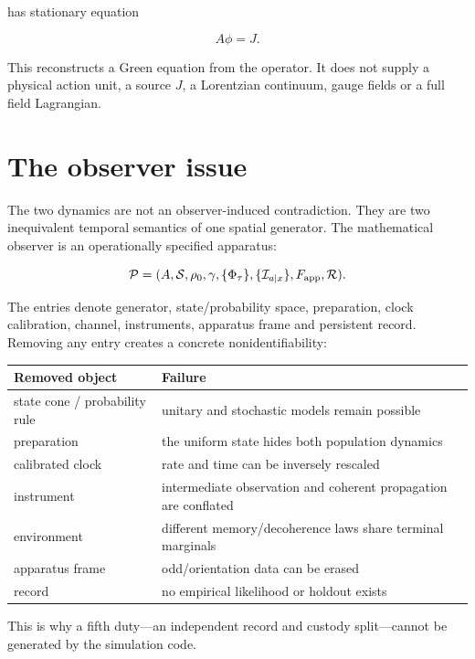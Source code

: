 \documentclass[11pt,a4paper,openany]{report}
\begin{document}
has stationary equation

\[
A\phi=J.
\]

This reconstructs a Green equation from the operator. It does not supply a physical action unit, a source \(J\), a Lorentzian continuum, gauge fields or a full field Lagrangian.

\section{The observer issue}

The two dynamics are not an observer-induced contradiction. They are two inequivalent temporal semantics of one spatial generator. The mathematical observer is an operationally specified apparatus:

\[
\mathcal P
=
(A,\mathcal S,\rho_0,\gamma,\{\Phi_\tau\},
\{\mathcal I_{a|x}\},F_{\rm app},\mathcal R).
\]

The entries denote generator, state/\allowbreak{}probability space, preparation, clock calibration, channel, instruments, apparatus frame and persistent record. Removing any entry creates a concrete nonidentifiability:

\begin{center}
\begingroup\small
\setlength{\tabcolsep}{3.5pt}
\renewcommand{\arraystretch}{1.16}
\begin{longtable}{@{}p{}p{}@{}}
\toprule
\textbf{Removed object} & \textbf{Failure} \\
\midrule
\endhead
state cone /\allowbreak{} probability rule & unitary and stochastic models remain possible \\
preparation & the uniform state hides both population dynamics \\
calibrated clock & rate and time can be inversely rescaled \\
instrument & intermediate observation and coherent propagation are conflated \\
environment & different memory/\allowbreak{}decoherence laws share terminal marginals \\
apparatus frame & odd/\allowbreak{}orientation data can be erased \\
record & no empirical likelihood or holdout exists \\
\bottomrule
\end{longtable}
\endgroup
\end{center}

This is why a fifth duty---an independent record and custody split---cannot be generated by the simulation code.
\end{document}
